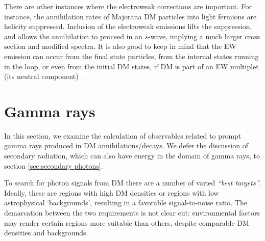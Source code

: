 There are other instances where the electroweak corrections are important. For instance, the annihilation rates of Majorana DM particles into light fermions are helicity suppressed. Inclusion of the electroweak emissions lifts the suppression, and allows the annihilation to proceed in an $s$-wave, implying a much larger cross section and modified spectra. It is also good to keep in mind that the EW emission can occur from the final state particles, from the internal states running in the loop, or even from the  initial DM states, if DM is part of an EW multiplet (its neutral component)~\cite{EWbrem}.



\section{Gamma rays}\index{$\gamma$}
\label{sec:IDgamma}

In this section, we examine the calculation of observables related to prompt gamma rays produced in DM annihilations/decays. We defer the discussion of secondary radiation, which can also have energy in the domain of gamma rays, to section  \ref{sec:secondary photons}.

\smallskip

To search for photon signals from DM  there are a number of varied {\em ``best targets''}. Ideally, these are regions with high DM densities or regions with low astrophysical `backgrounds', resulting in a favorable signal-to-noise ratio. The demarcation between the two requirements is not clear cut: environmental factors may render certain regions more suitable than others, despite comparable DM densities and backgrounds.

